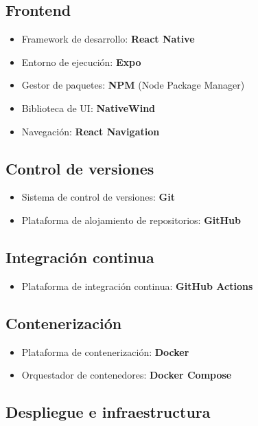 \subsection{Frontend}

\begin{itemize}
    \item Framework de desarrollo: \textbf{React Native}
    \item Entorno de ejecución: \textbf{Expo}
    \item Gestor de paquetes: \textbf{NPM} (Node Package Manager)
    \item Biblioteca de UI: \textbf{NativeWind}
    \item Navegación: \textbf{React Navigation}
\end{itemize}

\subsection{Control de versiones}

\begin{itemize}
    \item Sistema de control de versiones: \textbf{Git}
    \item Plataforma de alojamiento de repositorios: \textbf{GitHub}
\end{itemize}

\subsection{Integración continua}

\begin{itemize}
    \item Plataforma de integración continua: \textbf{GitHub Actions}
\end{itemize}

\subsection{Contenerización}

\begin{itemize}
    \item Plataforma de contenerización: \textbf{Docker}
    \item Orquestador de contenedores: \textbf{Docker Compose}
\end{itemize}

\subsection{Despliegue e infraestructura}

